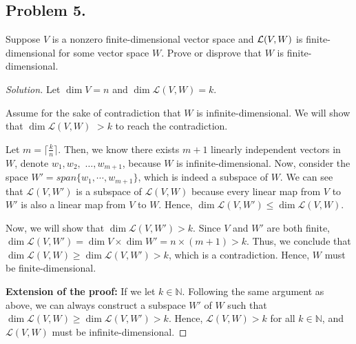 \documentclass{article}
\begin{document}
\newpage
\subsection*{Problem 5.}
Suppose $V$ is a nonzero finite-dimensional vector space and ${\cal L} (V,W)$ is finite-dimensional 
for some vector space $W$. Prove or disprove that $W$ is finite-dimensional.

\begin{proof}[Solution]
    Let $\dim V = n$ and $\dim\mathcal{L}(V,W) = k$.

    Assume for the sake of contradiction that $W$ is infinite-dimensional. We will show that 
    $\dim\mathcal{L}(V,W)$ $> k$ to reach the contradiction.

    Let $m = \lceil{\frac{k}{n}}\rceil$. Then, we know there exists $m+1$ linearly independent vectors 
    in $W$, denote $w_1, w_2,$ $\ldots, w_{m+1}$, because $W$ is infinite-dimensional. Now, consider 
    the space $W' = span\{w_1, \cdots, w_{m+1}\}$, which is indeed a subspace of $W$. We can see 
    that $\mathcal{L}(V,W')$ is a subspace of $\mathcal{L}(V,W)$ because every linear map from 
    $V$ to $W'$ is also a linear map from $V$ to $W$. Hence, $\dim\mathcal{L}(V,W') \leq 
    \dim\mathcal{L}(V,W)$.

    Now, we will show that $\dim\mathcal{L}(V,W') > k$. Since $V$ and $W'$ are both finite, 
    $\dim \mathcal{L}(V,W') = \dim V \times \dim W' = n \times (m+1) > k$. Thus, we conclude that 
    $\dim\mathcal{L}(V,W) \ge \dim\mathcal{L}(V,W') > k$, which is a contradiction. Hence, $W$ must 
    be finite-dimensional.

    \textbf{Extension of the proof:}
    If we let $k\in\mathbb{N}$. Following the same argument as above, we can always construct a 
    subspace $W'$ of $W$ such that $\dim\mathcal{L}(V,W) \ge \dim\mathcal{L}(V,W') > k$. Hence, 
    $\mathcal{L}(V,W) > k$ for all $k\in\mathbb{N}$, and $\mathcal{L}(V,W)$ must be 
    infinite-dimensional.
    
\end{proof}
\end{document}
